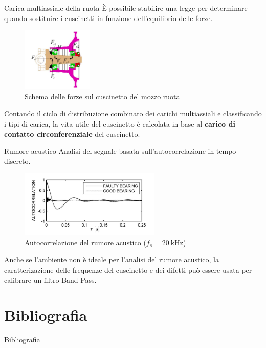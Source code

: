 \documentclass{beamer}
\begin{document}
\begin{frame}{Carica multiassiale della ruota}
    \small
    È possibile stabilire una legge per determinare quando sostituire i cuscinetti in funzione dell'equilibrio delle forze\cite{zhao2021service}.

    \begin{figure}
        \centering
        \includegraphics[width=0.3\textwidth]{Figures/Force_Diagram.png}
        \caption{Schema delle forze sul cuscinetto del mozzo ruota}
        \label{fig:Forces_Bearing}
    \end{figure}

    Contando il ciclo di distribuzione combinato dei carichi multiassiali e classificando i tipi di carica, la vita utile del cuscinetto è calcolata in base al \textbf{carico di contatto circonferenziale} del cuscinetto.
\end{frame}

\begin{frame}{Rumore acustico}
    Analisi del segnale basata sull'autocorrelazione in tempo discreto.

    \begin{figure}
        \centering
        \includegraphics[width=0.6\textwidth]{Figures/Acoustic.png}
        \caption{Autocorrelazione del rumore acustico ($f_s = \SI{20}{\kilo \hertz}$)}
        \label{fig:acoustic}
    \end{figure}

    Anche se l'ambiente non è ideale per l'analisi del rumore acustico, la caratterizazione delle frequenze del cuscinetto e dei difetti può essere usata per calibrare un filtro Band-Pass.

\end{frame}

\section*{Bibliografia}

\begin{frame}[allowframebreaks]{Bibliografia}
    \printbibliography
\end{frame}
\end{document}
